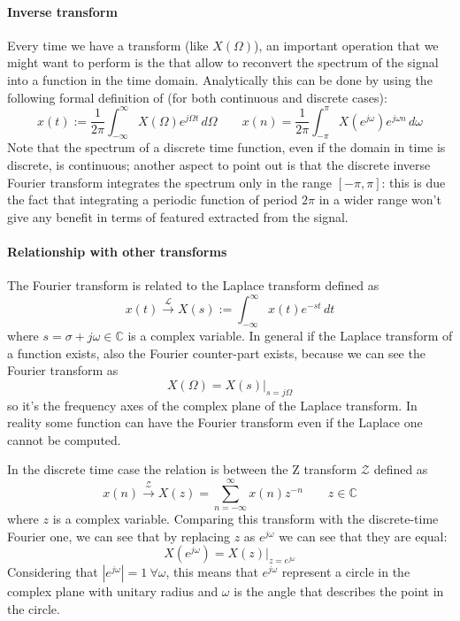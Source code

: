 	\paragraph{Inverse transform} Every time we have a transform (like $X(\Omega)$), an important operation that we might want to perform is the  that allow to reconvert the spectrum of the signal into a function in the time domain. Analytically this can be done by using the following formal definition of  (for both continuous and discrete cases):
	\begin{equation}
		x(t) := \frac 1 {2\pi} \int_{-\infty}^\infty X(\Omega) e^{j\Omega t} \, d\Omega \qquad x(n) = \frac 1{2\pi} \int_{-\pi}^\pi X\left(e^{j\omega}\right) e^{j\omega n}\, d\omega
	\end{equation}
	Note that the spectrum of a discrete time function, even if the domain in time is discrete, is continuous; another aspect to point out is that the discrete inverse Fourier transform integrates the spectrum only in the range $[-\pi,\pi]$: this is due the fact that integrating a periodic function of period $2\pi$ in a wider range won't give any benefit in terms of featured extracted from the signal.

	\paragraph{Relationship with other transforms} The Fourier transform is related to the Laplace transform defined as
	\[x(t) \xrightarrow{\mathscr{L}} X(s) := \int_{-\infty}^\infty x(t) e^{-st} \, dt \]
	where $s = \sigma + j\omega \in \mathds C$ is a complex variable. In general if the Laplace transform of a function exists, also the Fourier counter-part exists, because we can see the Fourier transform as
	\[ X(\Omega) = X(s) \big|_{s = j\Omega} \]
	so it's the frequency axes of the complex plane of the Laplace transform. In reality some function can have the Fourier transform even if the Laplace one cannot be computed.
	
	In the discrete time case the relation is between the Z transform $\mathscr{Z}$ defined as
	\[x(n) \xrightarrow{\mathscr{Z}} X(z) = \sum_{n=-\infty}^{\infty} x(n) z^{-n}  \qquad z \in \mathds C \]
	where $z$ is a complex variable. Comparing this transform with the discrete-time Fourier one, we can see that by replacing $z$ as $e^{j\omega}$ we can see that they are equal:
	\[ X\left(e^{j\omega} \right) = X(z) \big|_{z = e^{j\omega}} \]
	Considering that $|e^{j\omega}| = 1 \ \forall \omega$, this means that $e^{j\omega}$ represent a circle in the complex plane with unitary radius and $\omega$ is the angle that describes the point in the circle.
	
